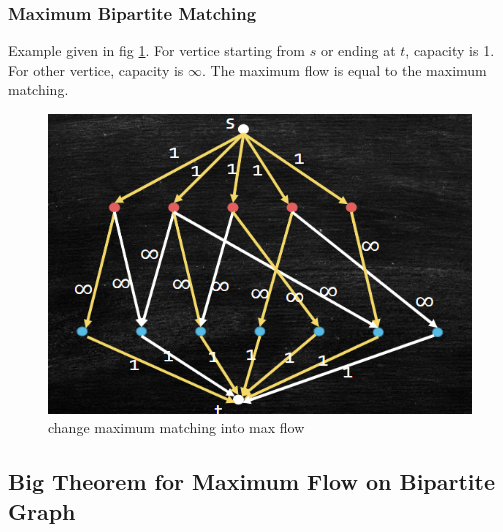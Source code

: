 \subsubsection{Maximum Bipartite Matching}
Example given in fig \ref{fig:MBM}. For vertice starting from $s$ or ending at $t$, capacity is 1. For other vertice, capacity is $\infty$. The maximum flow is equal to the maximum matching.
\begin{figure}
    \centering
    \includegraphics[width=0.5\linewidth]{Notes/fig/MaxMatching.png}
    \caption{change maximum matching into max flow}
    \label{fig:MBM}
\end{figure}

\subsection{Big Theorem for Maximum Flow on Bipartite Graph}

